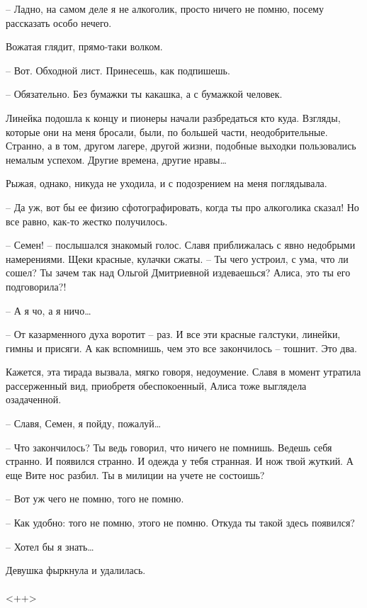 \documentclass[a4paper]{book}
\begin{document}
-- Ладно, на самом деле я не алкоголик, просто ничего не помню, посему рассказать особо нечего.

Вожатая глядит, прямо-таки волком. 

-- Вот. Обходной лист. Принесешь, как подпишешь.

-- Обязательно. Без бумажки ты какашка, а с бумажкой человек.

Линейка подошла к концу и пионеры начали разбредаться кто куда. Взгляды, которые они на меня бросали, были, по большей части, неодобрительные. Странно, а в том, другом лагере, другой жизни, подобные выходки пользовались немалым успехом. Другие времена, другие нравы\ldots

Рыжая, однако, никуда не уходила, и с подозрением на меня поглядывала. 

-- Да уж, вот бы ее физию сфотографировать, когда ты про алкоголика сказал! Но все равно, как-то жестко получилось.

-- Семен! -- послышался знакомый голос. Славя приближалась с явно недобрыми намерениями. Щеки красные, кулачки сжаты. -- Ты чего устроил, с ума, что ли сошел? Ты зачем так над Ольгой Дмитриевной издеваешься? Алиса, это ты его подговорила?!

-- А я чо, а я ничо\ldots 

-- От казарменного духа воротит -- раз. И все эти красные галстуки, линейки, гимны и присяги. А как вспомнишь, чем это все закончилось -- тошнит. Это два.

Кажется, эта тирада вызвала, мягко говоря, недоумение. Славя в момент утратила рассерженный вид, приобретя обеспокоенный, Алиса тоже выглядела озадаченной.

-- Славя, Семен, я  пойду, пожалуй\ldots 

-- Что закончилось? Ты ведь говорил, что ничего не помнишь. Ведешь себя странно. И появился странно. И одежда у тебя странная. И нож твой жуткий. А еще Вите нос разбил. Ты в милиции на учете не состоишь?

-- Вот уж чего не помню, того не помню.

-- Как удобно: того не помню, этого не помню. Откуда ты такой здесь появился?

-- Хотел бы я знать\ldots 

Девушка фыркнула и удалилась.
\\
\paragraph{}<++>
\end{document}
